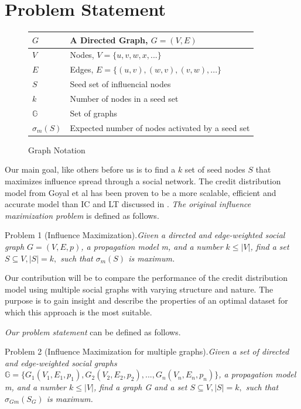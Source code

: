 \documentclass{acm_proc_article-sp}
\begin{document}
\section{Problem Statement}

\begin{figure}
	\centering
	\begin{tabulary}{\linewidth}{|l|L|}
			\hline
			$G$ & A Directed Graph, $G = (V,E)$ \\\hline
			$V$ & Nodes, $V = \{u,v,w,x,...\}$ \\\hline
			$E$ & Edges, $E = \{(u, v),(w, v),(v,w),...\}$ \\\hline
			$S$ & Seed set of influencial nodes \\\hline
			$k$ & Number of nodes in a seed set \\\hline
			$\mathbb{G}$ & Set of graphs \\\hline
			$\sigma_m(S)$ & Expected number of nodes activated by a seed set \\\hline
	\end{tabulary}
	\caption{Graph Notation}
	\label{general-notation}
\end{figure}

Our main goal, like others before us is to find a $k$ set of seed nodes $S$ that maximizes influence spread through a social network. The credit distribution model from Goyal et al has been proven to be a more scalable, efficient and accurate model than IC and LT discussed in \cite{kempe:maxspread}. \textit{The original influence maximization problem} is defined as follows.

\textsf{Problem 1 (Influence Maximization)}.\textit{Given a directed and edge-weighted social graph $ G = (V, E, p) $, a propagation model m, and a number $ k \leqslant |V| $, find a set $S \subseteq V , |S| = k,$ such that $\sigma_m (S)$ is maximum.}


Our contribution will be to compare the performance of the credit distribution model using multiple social graphs with varying structure and nature. The purpose is to gain insight and describe the properties of an optimal dataset for which this approach is the most suitable.

\textit{Our problem statement} can be defined as follows.

\textsf{Problem 2 (Influence Maximization for multiple graphs)}.\textit{Given a set of directed and edge-weighted social graphs \\ $ \mathbb{G} = \{G_1(V_1, E_1,p_1), G_2(V_2, E_2, p_2),...,G_n(V_n, E_n,p_n) \} $, a propagation model m, and a number $ k \leqslant |V| $, find a graph G and a set $S \subseteq V , |S| = k,$ such that $\sigma_{Gm}(S_G)$ is maximum.}
\end{document}

